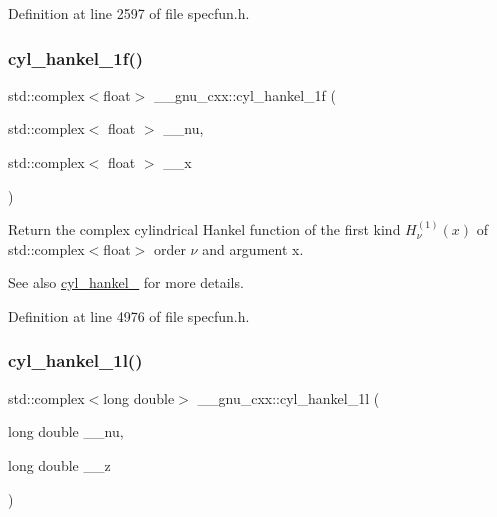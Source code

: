 Definition at line 2597 of file specfun.\+h.

\mbox{\label{group__mathsf__gnu_ga810e021a3f11c1b2253c15c6f4d41143}} 
\subsubsection{\texorpdfstring{cyl\+\_\+hankel\+\_\+1f()}{cyl\_hankel\_1f()}\hspace{0.1cm}{\footnotesize\ttfamily [2/2]}}
{\footnotesize\ttfamily std\+::complex$<$float$>$ \+\_\+\+\_\+gnu\+\_\+cxx\+::cyl\+\_\+hankel\+\_\+1f (\begin{DoxyParamCaption}\item[{std\+::complex$<$ float $>$}]{\+\_\+\+\_\+nu,  }\item[{std\+::complex$<$ float $>$}]{\+\_\+\+\_\+x }\end{DoxyParamCaption})\hspace{0.3cm}{\ttfamily [inline]}}

Return the complex cylindrical Hankel function of the first kind $ H^{(1)}_\nu(x) $ of {\ttfamily std\+::complex$<$float$>$} order $ \nu $ and argument {\ttfamily x}.

\begin{DoxySeeAlso}{See also}
\hyperlink{group__mathsf__gnu_ga5329bba77d10a9d2f15d9bbe43a70db3}{cyl\+\_\+hankel\+\_} for more details. 
\end{DoxySeeAlso}


Definition at line 4976 of file specfun.\+h.

\mbox{\label{group__mathsf__gnu_gacb49c66b4267fbc56906db02f14365f2}} 
\subsubsection{\texorpdfstring{cyl\+\_\+hankel\+\_\+1l()}{cyl\_hankel\_1l()}\hspace{0.1cm}{\footnotesize\ttfamily [1/2]}}
{\footnotesize\ttfamily std\+::complex$<$long double$>$ \+\_\+\+\_\+gnu\+\_\+cxx\+::cyl\+\_\+hankel\+\_\+1l (\begin{DoxyParamCaption}\item[{long double}]{\+\_\+\+\_\+nu,  }\item[{long double}]{\+\_\+\+\_\+z }\end{DoxyParamCaption})\hspace{0.3cm}{\ttfamily [inline]}}

